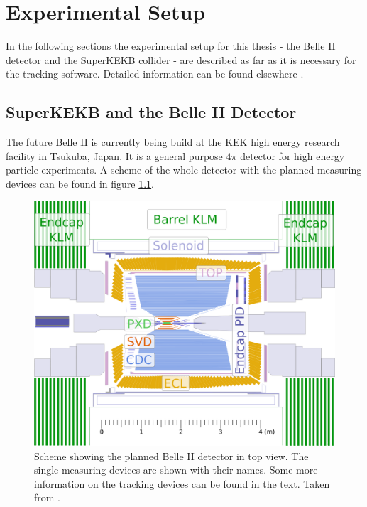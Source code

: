 \chapter{Experimental Setup} \label{chapter-ex}
In the following sections the experimental setup for this thesis - the Belle II detector and the SuperKEKB collider - are described as far as it is necessary for the tracking software. Detailed information can be found elsewhere \cite{tdr}.


\section{SuperKEKB and the Belle II Detector}

The future Belle II is currently being build at the KEK high energy research facility in Tsukuba, Japan. It is a general purpose $4\pi$ detector for high energy particle experiments. A scheme of the whole detector with the planned measuring devices can be found in figure \ref{fig-belle2}.

\begin{figure}
 \centering
 \includegraphics[height=0.4\textheight]{figures/experimental_setup/detector_crossection_labels.pdf}
 \caption[Schema of the planned Belle II detector.]{Scheme showing the planned Belle II detector in top view. The single measuring devices are shown with their names. Some more information on the tracking devices can be found in the text. Taken from \cite{christian}.}
 \label{fig-belle2}
\end{figure}


